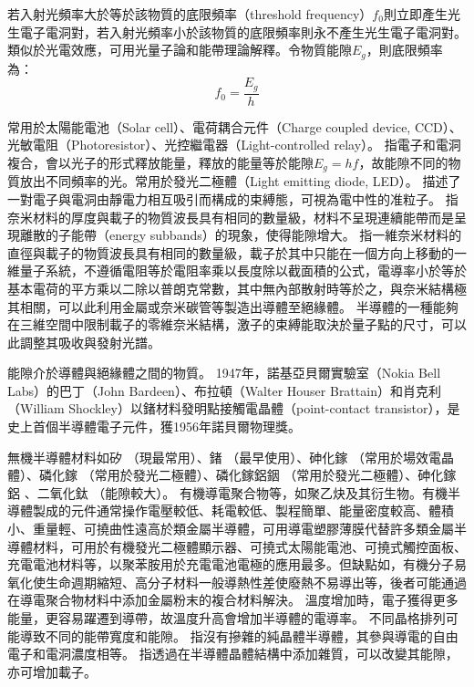 \documentclass[a4paper,12pt]{report}
\begin{document}
若入射光頻率大於等於該物質的底限頻率（threshold frequency）$f_0$則立即產生光生電子電洞對，若入射光頻率小於該物質的底限頻率則永不產生光生電子電洞對。類似於光電效應，可用光量子論和能帶理論解釋。令物質能隙$E_g$，則底限頻率為：
\[f_0=\frac{E_g}{h}\]

常用於太陽能電池（Solar cell）、電荷耦合元件（Charge coupled device, CCD）、光敏電阻（Photoresistor）、光控繼電器（Light-controlled relay）。
指電子和電洞複合，會以光子的形式釋放能量，釋放的能量等於能隙$E_g=hf$，故能隙不同的物質放出不同頻率的光。常用於發光二極體（Light emitting diode, LED）。
描述了一對電子與電洞由靜電力相互吸引而構成的束縛態，可視為電中性的准粒子。
指奈米材料的厚度與載子的物質波長具有相同的數量級，材料不呈現連續能帶而是呈現離散的子能帶（energy subbands）的現象，使得能隙增大。
指一維奈米材料的直徑與載子的物質波長具有相同的數量級，載子於其中只能在一個方向上移動的一維量子系統，不遵循電阻等於電阻率乘以長度除以截面積的公式，電導率小於等於基本電荷的平方乘以二除以普朗克常數，其中無內部散射時等於之，與奈米結構極其相關，可以此利用金屬或奈米碳管等製造出導體至絕緣體。
半導體的一種能夠在三維空間中限制載子的零維奈米結構，激子的束縛能取決於量子點的尺寸，可以此調整其吸收與發射光譜。


能隙介於導體與絕緣體之間的物質。
1947年，諾基亞貝爾實驗室（Nokia Bell Labs）的巴丁（John Bardeen）、布拉頓（Walter Houser Brattain）和肖克利（William Shockley）以鍺材料發明點接觸電晶體（point-contact transistor），是史上首個半導體電子元件，獲1956年諾貝爾物理獎。

無機半導體材料如矽 （現最常用）、鍺 （最早使用）、砷化鎵 （常用於場效電晶體）、磷化鎵 （常用於發光二極體）、磷化鎵鋁銦 （常用於發光二極體）、砷化鎵鋁 、二氧化鈦 （能隙較大）。
有機導電聚合物等，如聚乙炔及其衍生物。有機半導體製成的元件通常操作電壓較低、耗電較低、製程簡單、能量密度較高、體積小、重量輕、可撓曲性遠高於類金屬半導體，可用導電塑膠薄膜代替許多類金屬半導體材料，可用於有機發光二極體顯示器、可撓式太陽能電池、可撓式觸控面板、充電電池材料等，以聚苯胺用於充電電池電極的應用最多。但缺點如，有機分子易氧化使生命週期縮短、高分子材料一般導熱性差使廢熱不易導出等，後者可能通過在導電聚合物材料中添加金屬粉末的複合材料解決。
溫度增加時，電子獲得更多能量，更容易躍遷到導帶，故溫度升高會增加半導體的電導率。
不同晶格排列可能導致不同的能帶寬度和能隙。
指沒有摻雜的純晶體半導體，其參與導電的自由電子和電洞濃度相等。
指透過在半導體晶體結構中添加雜質，可以改變其能隙，亦可增加載子。
\end{document}
